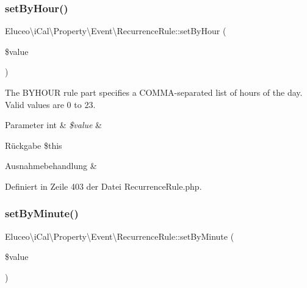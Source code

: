 \subsubsection{\texorpdfstring{set\+By\+Hour()}{setByHour()}\hspace{0.1cm}{\footnotesize\ttfamily [3/3]}}
{\footnotesize\ttfamily Eluceo\textbackslash{}i\+Cal\textbackslash{}\+Property\textbackslash{}\+Event\textbackslash{}\+Recurrence\+Rule\+::set\+By\+Hour (\begin{DoxyParamCaption}\item[{}]{\$value }\end{DoxyParamCaption})}

The B\+Y\+H\+O\+UR rule part specifies a C\+O\+M\+M\+A-\/separated list of hours of the day. Valid values are 0 to 23.


\begin{DoxyParams}[1]{Parameter}
int & {\em \$value} & \\
\hline
\end{DoxyParams}
\begin{DoxyReturn}{Rückgabe}
\$this
\end{DoxyReturn}

\begin{DoxyExceptions}{Ausnahmebehandlung}
{\em } & \\
\hline
\end{DoxyExceptions}


Definiert in Zeile 403 der Datei Recurrence\+Rule.\+php.

\mbox{\label{class_eluceo_1_1i_cal_1_1_property_1_1_event_1_1_recurrence_rule_a94cd2608d8ecb268f10610e20f4fcd4c}} 
\subsubsection{\texorpdfstring{set\+By\+Minute()}{setByMinute()}\hspace{0.1cm}{\footnotesize\ttfamily [1/3]}}
{\footnotesize\ttfamily Eluceo\textbackslash{}i\+Cal\textbackslash{}\+Property\textbackslash{}\+Event\textbackslash{}\+Recurrence\+Rule\+::set\+By\+Minute (\begin{DoxyParamCaption}\item[{}]{\$value }\end{DoxyParamCaption})}


